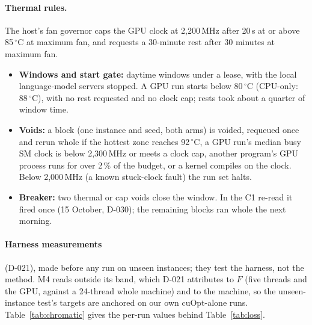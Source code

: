 \paragraph{Thermal rules.} The host's fan governor caps the GPU clock at 2{,}200\,MHz after 20\,s at or above
85\,$^\circ$C at maximum fan, and requests a 30-minute rest after 30 minutes at maximum fan.
\begin{itemize}\setlength{\itemsep}{0pt}\setlength{\parskip}{0pt}
\item \textbf{Windows and start gate:} daytime windows under a lease, with the local language-model servers stopped.
  A GPU run starts below 80\,$^\circ$C (CPU-only: 88\,$^\circ$C), with no rest requested and no clock cap; rests took
  about a quarter of window time.
\item \textbf{Voids:} a block (one instance and seed, both arms) is voided, requeued once and rerun whole if the hottest zone
  reaches 92\,$^\circ$C, a GPU run's median busy SM clock is below 2{,}300\,MHz or meets a clock cap, another program's GPU
  process runs for over 2\,\% of the budget, or a kernel compiles on the clock. Below 2{,}000\,MHz (a known stuck-clock
  fault) the run set halts.
\item \textbf{Breaker:} two thermal or cap voids close the window. In the C1 re-read it fired once (15 October, D-030);
  the remaining blocks ran whole the next morning.
\end{itemize}

\paragraph{Harness measurements} (D-021), made before any run on unseen instances; they test the harness, not the
method. M4 reads outside its band, which D-021 attributes to $F$ (five threads and the GPU, against a 24-thread whole
machine) and to the machine, so the unseen-instance test's targets are anchored on our own cuOpt-alone runs.
Table~\ref{tab:chromatic} gives the per-run values behind Table~\ref{tab:loss}.

